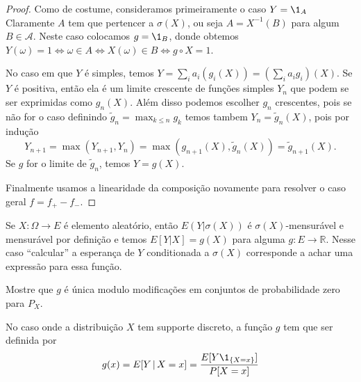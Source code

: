 \begin{proof}
  Como de costume, consideramos primeiramente o caso $Y = \1_A$
  Claramente $A$ tem que pertencer a $\sigma(X)$, ou seja $A = X^{-1}(B)$ para algum $B \in \mathcal{A}$.
  Neste caso colocamos $g = \1_B$, donde obtemos $Y(\omega) = 1 \Leftrightarrow \omega \in A \Leftrightarrow X(\omega) \in B \Leftrightarrow g \circ X = 1$.

  No caso em que $Y$ é simples, temos $Y = \sum_i a_i (g_i (X)) = (\sum_i a_i g_i)(X)$.
  Se $Y$ é positiva, então ela é um limite crescente de funções simples $Y_n$ que podem se ser exprimidas como $g_n(X)$.
  Além disso podemos escolher $g_n$ crescentes, pois se não for o caso definindo $\tilde g_n= \max_{k\le n}g_k$ temos
  tambem $Y_n=\tilde g_n(X)$, pois por indução
  \begin{equation}
    Y_{n+1} = \max(Y_{n+1}, Y_{n}) = \max(g_{n+1}(X) , \tilde g_n(X)) = \tilde g_{n+1}(X).
  \end{equation}
Se $g$ for o limite de $\tilde g_n$, temos $Y=g(X)$.

\medskip

  Finalmente usamos a linearidade da composição novamente para resolver o caso geral $f = f_+ - f_-$.
\end{proof}







Se $X: \Omega \to E$ é elemento aleatório, então $E(Y|\sigma(X))$ é $\sigma(X)$-mensurável e mensurável por definição e temos
$E[Y| X] = g(X)$ para alguma $g: E \to \mathbb{R}$.
Nesse caso ``calcular'' a esperança de $Y$ conditionada a $\sigma(X)$ corresponde a achar uma expressão para essa função.

\begin{exercise}
  Mostre que $g$ é única modulo modificações em conjuntos de probabilidade zero para $P_X$.
\end{exercise}

No caso onde a distribuição $X$ tem supporte discreto, a função $g$ tem que ser definida por
$$g(x)=E[Y \, | \, X = x]= \frac{E[Y\1_{\{X=x\}}]}{P[X=x]}$$


%

